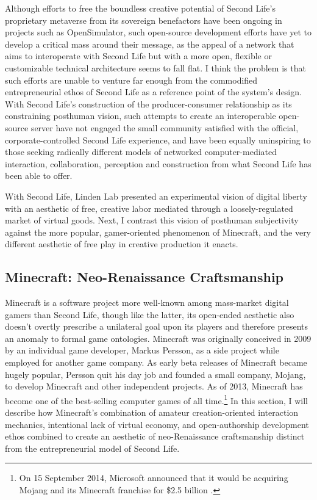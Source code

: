 Although efforts to free the boundless creative potential of Second Life's proprietary metaverse from its sovereign benefactors have been ongoing in projects such as OpenSimulator, such open-source development efforts have yet to develop a critical mass around their message, as the appeal of a network that aims to interoperate with Second Life but with a more open, flexible or customizable technical architecture seems to fall flat. I think the problem is that such efforts are unable to venture far enough from the commodified entrepreneurial ethos of Second Life as a reference point of the system's design. With Second Life's construction of the producer-consumer relationship as its constraining posthuman vision, such attempts to create an interoperable open-source server have not engaged the small community satisfied with the official, corporate-controlled Second Life experience, and have been equally uninspiring to those seeking radically different models of networked computer-mediated interaction, collaboration, perception and construction from what Second Life has been able to offer.

With Second Life, Linden Lab presented an experimental vision of digital liberty with an aesthetic of free, creative labor mediated through a loosely-regulated market of virtual goods. Next, I contrast this vision of posthuman subjectivity against the more popular, gamer-oriented phenomenon of Minecraft, and the very different aesthetic of free play in creative production it enacts.

\subsection*{Minecraft: Neo-Renaissance Craftsmanship}
Minecraft is a software project more well-known among mass-market digital gamers than Second Life, though like the latter, its open-ended aesthetic also doesn't overtly prescribe a unilateral goal upon its players and therefore presents an anomaly to formal game ontologies. Minecraft was originally conceived in 2009 by an individual game developer, Markus Persson, as a side project while employed for another game company. As early beta releases of Minecraft became hugely popular, Persson quit his day job and founded a small company, Mojang, to develop Minecraft and other independent projects. As of 2013, Minecraft has become one of the best-selling computer games of all time.\footnote{
  On 15 September 2014, Microsoft announced that it would be acquiring Mojang and its Minecraft franchise for \$2.5 billion \autocite*{Microsoft-2014}.
}
In this section, I will describe how Minecraft's combination of amateur creation-oriented interaction mechanics, intentional lack of virtual economy, and open-authorship development ethos combined to create an aesthetic of neo-Renaissance craftsmanship distinct from the entrepreneurial model of Second Life.

